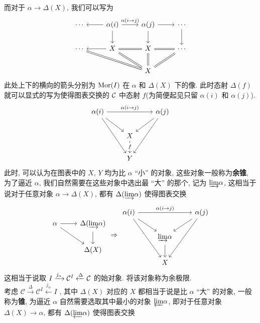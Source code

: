 而对于 $\alpha \to \Delta(X)$, 我们可以写为
\[\begin{tikzcd}
	\cdots & {\alpha(i)} & {\alpha(j)} & \cdots \\
	\cdots & X & X & \cdots \\
	&& X
	\arrow[from=1-2, to=1-1]
	\arrow["{\alpha(i\to j)}", from=1-2, to=1-3]
	\arrow[from=1-2, to=2-2]
	\arrow[from=1-3, to=1-4]
	\arrow[from=1-3, to=2-3]
	\arrow[from=1-4, to=2-4]
	\arrow[equal, from=2-1, to=3-3]
	\arrow[from=2-2, to=2-1]
	\arrow[equal, from=2-2, to=2-3]
	\arrow[equal, from=2-2, to=3-3]
	\arrow[equal, from=2-3, to=2-4]
	\arrow[equal, from=2-3, to=3-3]
	\arrow[equal, from=2-4, to=3-3]
\end{tikzcd}\]
此处上下的横向的箭头分别为 $\operatorname{Mor}(I)$ 在 $\alpha$ 和 $\Delta(X)$ 下的像. 此时态射 $\Delta(f)$ 就可以显式的写为使得图表交换的 $\cal{C}$ 中态射 $f$(为简便起见只留 $\alpha(i)$ 和 $\alpha(j)$).
\[\begin{tikzcd}
	{\alpha(i)} && {\alpha(j)} \\
	& X \\
	& Y
	\arrow["{\alpha(i\to j)}", from=1-1, to=1-3]
	\arrow[from=1-1, to=2-2]
	\arrow[from=1-1, to=3-2]
	\arrow[from=1-3, to=2-2]
	\arrow[from=1-3, to=3-2]
	\arrow["f"{description}, from=2-2, to=3-2]
\end{tikzcd}\]
此时, 可以认为在图表中的 $X$, $Y$ 均为比 $\alpha$ ``小'' 的对象, 这些对象一般称为\textbf{余锥}, 为了逼近 $\alpha$, 我们自然需要在这些对象中选出最 ``大'' 的那个, 记为 $\underrightarrow{\lim} \alpha$, 这相当于说对于任意对象 $\alpha \to \Delta(X)$, 都有 $\Delta(\underrightarrow{\lim} \alpha)$ 使得图表交换
\[\begin{tikzcd}
	\alpha & {\Delta(\indlim \alpha)} \\
	& {\Delta(X)}
	\arrow[from=1-1, to=1-2]
	\arrow[from=1-1, to=2-2]
	\arrow[from=1-2, to=2-2]
\end{tikzcd} \Rightarrow\begin{tikzcd}
	{\alpha(i)} && {\alpha(j)} \\
	& {\indlim \alpha} \\
	& X
	\arrow["{{\alpha(i\to j)}}", from=1-1, to=1-3]
	\arrow[from=1-1, to=2-2]
	\arrow[from=1-1, to=3-2]
	\arrow[from=1-3, to=2-2]
	\arrow[from=1-3, to=3-2]
	\arrow[from=2-2, to=3-2]
\end{tikzcd}\]
这相当于说取 $I \xrightarrow{j_{\alpha}} \mathcal{C}^I \xleftarrow{\Delta} \cal{C}$ 的始对象. 将该对象称为余极限.\\
考虑 $\mathcal{C} \xrightarrow{\Delta} \mathcal{C}^I \xleftarrow{j_{\alpha}} I$ , 其中 $\Delta(X)$ 对应的 $X$ 都相当于说是比 $\alpha$ ``大'' 的对象, 一般称为\textbf{锥}, 为逼近 $\alpha$ 自然需要选取其中最小的对象 $\underleftarrow{\lim} \alpha$, 即对于任意对象 $\Delta(X) \to \alpha$, 都有 $\Delta(\underleftarrow{\lim} \alpha)$ 使得图表交换
